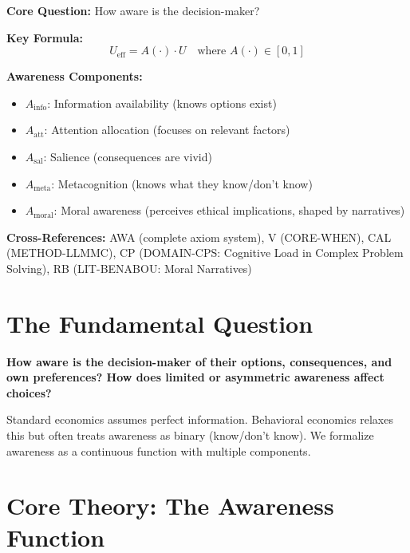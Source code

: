 \begin{tcolorbox}[colback=blue!5!white, colframe=blue!75!black,
    title=Quick Reference: CORE-AWARE]

\textbf{Core Question:} How aware is the decision-maker?

\textbf{Key Formula:}
\begin{equation}
U_{\text{eff}} = A(\cdot) \cdot U \quad \text{where } A(\cdot) \in [0, 1]
\label{eq:aware-effective}
\end{equation}

\textbf{Awareness Components:}
\begin{itemize}[nosep]
\item $A_{\text{info}}$: Information availability (knows options exist)
\item $A_{\text{att}}$: Attention allocation (focuses on relevant factors)
\item $A_{\text{sal}}$: Salience (consequences are vivid)
\item $A_{\text{meta}}$: Metacognition (knows what they know/don't know)
\item $A_{\text{moral}}$: Moral awareness (perceives ethical implications, shaped by narratives)
\end{itemize}

\textbf{Cross-References:}
AWA (complete axiom system), V (CORE-WHEN), CAL (METHOD-LLMMC), CP (DOMAIN-CPS: Cognitive Load in Complex Problem Solving), RB (LIT-BENABOU: Moral Narratives)

\end{tcolorbox}

\section{The Fundamental Question}
\label{sec:aware-fundamental}

\begin{tcolorbox}[colback=red!5!white, colframe=red!75!black,
    title=The Fundamental Question]
\textbf{How aware is the decision-maker of their options, consequences, and
own preferences? How does limited or asymmetric awareness affect choices?}
\end{tcolorbox}

Standard economics assumes perfect information. Behavioral economics relaxes this
but often treats awareness as binary (know/don't know). We formalize awareness
as a continuous function with multiple components.

\section{Core Theory: The Awareness Function}
\label{sec:aware-theory}

